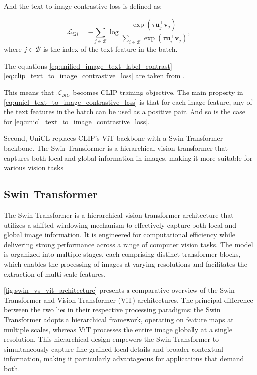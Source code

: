 And the text-to-image contrastive loss is defined as:

\begin{equation} \label{eq:clip_text_to_image_contrastive_loss}
    \mathcal{L}_{t2i} = - \sum_{j \in \mathcal{B}} 
    \log \frac{\exp(\tau \mathbf{u}_j^\top \mathbf{v}_j)}{\sum_{i \in \mathcal{B}} \exp(\tau \mathbf{u}_i^\top \mathbf{v}_j)},
\end{equation}
where $j \in \mathcal{B}$ is the index of the text feature in the batch. 

The equations \ref{eq:unified_image_text_label_contrast}-\ref{eq:clip_text_to_image_contrastive_loss} are taken from \cite{vl_unicl}.

This means that $\mathcal{L}_{BiC}$ becomes CLIP training objective. The main property in \autoref{eq:unicl_text_to_image_contrastive_loss} is that for each image feature, any of the text features in the batch can be used as a positive pair. And so is the case for \autoref{eq:unicl_text_to_image_contrastive_loss}.

Second, UniCL replaces CLIP's ViT backbone with a Swin Transformer backbone. The Swin Transformer is a hierarchical vision transformer that captures both local and global information in images, making it more suitable for various vision tasks.

\subsection{Swin Transformer}
\label{subsec:swin_transformer}
The Swin Transformer \cite{transformer_swin} is a hierarchical vision transformer architecture that utilizes a shifted windowing mechanism to effectively capture both local and global image information. It is engineered for computational efficiency while delivering strong performance across a range of computer vision tasks. The model is organized into multiple stages, each comprising distinct transformer blocks, which enables the processing of images at varying resolutions and facilitates the extraction of multi-scale features.

\autoref{fig:swin_vs_vit_architecture} presents a comparative overview of the Swin Transformer and Vision Transformer (ViT) architectures. The principal difference between the two lies in their respective processing paradigms: the Swin Transformer adopts a hierarchical framework, operating on feature maps at multiple scales, whereas ViT processes the entire image globally at a single resolution. This hierarchical design empowers the Swin Transformer to simultaneously capture fine-grained local details and broader contextual information, making it particularly advantageous for applications that demand both.

